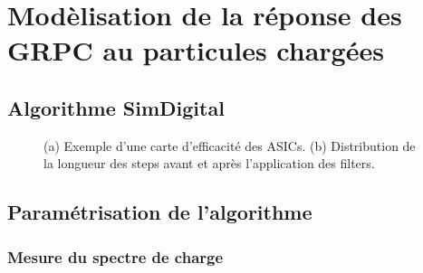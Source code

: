 
\section{Modèlisation de la réponse des GRPC au particules chargées}


\subsection{Algorithme SimDigital}

\begin{figure}[!ht]
  \caption{(a) Exemple d'une carte d'efficacité des ASICs. (b) Distribution de la longueur des steps avant et après l'application des filters.\label{fig.digit_filters}}
\end{figure}


\subsection{Paramétrisation de l'algorithme}


\subsubsection{Mesure du spectre de charge}

